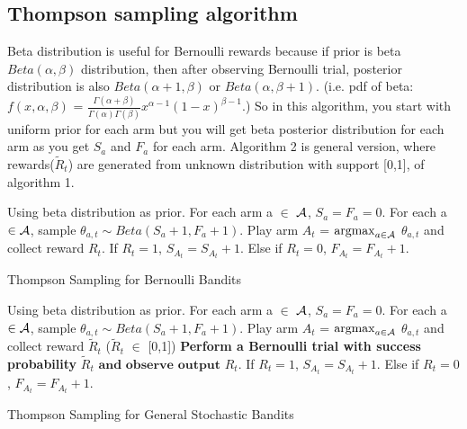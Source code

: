 \documentclass[11pt]{article}
\begin{document}
\subsection{Thompson sampling algorithm}
Beta distribution is useful for Bernoulli rewards because if prior is beta $Beta(\alpha, \beta)$ distribution, then after observing Bernoulli trial, posterior distribution is also $Beta(\alpha+1, \beta)$ or $Beta(\alpha, \beta+1)$. (i.e. pdf of beta: $f(x,\alpha, \beta)$ = $\frac{\Gamma(\alpha+\beta)}{\Gamma(\alpha)\Gamma(\beta)}$$x^{\alpha-1}(1-x)^{\beta-1}$.) So in this algorithm, you start with uniform prior for each arm but you will get beta posterior distribution for each arm as you get $S_a$ and $F_a$ for each arm. Algorithm 2 is general version, where rewards($\tilde{R}_t$) are generated from unknown distribution with support [0,1], of algorithm 1. \\
\begin{algorithm}
	\begin{algorithmic}[1]
		\STATE Using beta distribution as prior.
		\STATE For each arm a $\in$ $\mathcal{A}$, $S_{a}=F_{a}=0$.
		\STATE For each a$\in\mathcal{A}$, sample $\theta_{a,t} \sim Beta(S_{a}+1,F_{a}+1)$.
		\STATE Play arm $A_t$ = $\operatorname*{argmax}_{a\in \mathcal{A}}$ $\theta_{a,t}$ and collect reward $R_t$.
		\STATE If $R_t=1$, $S_{A_t}=S_{A_t}+1$. Else if $R_t=0$, $F_{A_t}=F_{A_t}+1$.
		\ENDFOR 
		\end{algorithmic}
		\caption{Thompson Sampling for Bernoulli Bandits}
\end{algorithm}

\begin{algorithm}
	\begin{algorithmic}[1]
		\STATE Using beta distribution as prior.
		\STATE For each arm a $\in$ $\mathcal{A}$, $S_{a}=F_{a}=0$.
		\STATE For each a$\in\mathcal{A}$, sample $\theta_{a,t} \sim Beta(S_{a}+1,F_{a}+1)$.
		\STATE Play arm $A_t$ = $\operatorname*{argmax}_{a\in \mathcal{A}}$ $\theta_{a,t}$ and collect reward $\tilde{R}_t$ ($\tilde{R}_t$ $\in$ [0,1])
		\STATE \textbf{Perform a Bernoulli trial with success probability} $\tilde{R}_t$ $\textbf{and observe output}$ $R_t$.
		\STATE If $R_t=1$, $S_{A_t}=S_{A_t}+1$. Else if $R_t=0$, $F_{A_t}=F_{A_t}+1$.
		\ENDFOR 
	\end{algorithmic}
	\caption{Thompson Sampling for General Stochastic Bandits}
\end{algorithm}
\end{document}
